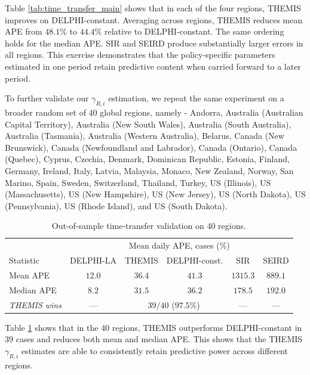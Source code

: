 \documentclass[msom,blindrev]{informs3} %
\newcommand{\rev}[1]{{\color{blue}#1}}
\begin{document}
\begin{APPENDICES}
{\color{blue}
Table \ref{tab:time_transfer_main} shows that in each of the four regions, THEMIS improves on DELPHI-constant. Averaging across regions, THEMIS reduces mean APE from $48.1\%$ to $44.4\%$ relative to DELPHI-constant. The same ordering holds for the median APE. SIR and SEIRD produce substantially larger errors in all regions. This exercise demonstrates that the policy-specific parameters estimated in one period retain predictive content when carried forward to a later period.
}

{\color{blue}
To further validate our $\gamma_{R,i}$ estimation, we repeat the same experiment on a broader random set of 40 global regions, namely - Andorra, Australia (Australian Capital Territory), Australia (New South Wales), Australia (South
  Australia), Australia (Tasmania), Australia (Western Australia), Belarus, Canada (New Brunswick),
  Canada (Newfoundland and Labrador), Canada (Ontario), Canada (Quebec), Cyprus, Czechia, Denmark,      
  Dominican Republic, Estonia, Finland, Germany, Ireland, Italy, Latvia, Malaysia, Monaco, New Zealand,
  Norway, San Marino, Spain, Sweden, Switzerland, Thailand, Turkey, US (Illinois), US (Massachusetts),  
  US (New Hampshire), US (New Jersey), US (North Dakota), US (Pennsylvania), US (Rhode Island), and US
  (South Dakota).
}

\begin{table}[htbp!]
\centering
{\color{blue}
\begin{tabular}{|l|ccccc|}
\hline
& \multicolumn{5}{c|}{Mean daily APE, cases (\%)} \\
Statistic & DELPHI-LA & THEMIS & DELPHI-const. & SIR & SEIRD \\\hline
Mean APE   & $12.0$ & $\mathbf{36.4}$ & $41.3$ & $1315.3$ & $889.1$ \\
Median APE & $8.2$  & $\mathbf{31.5}$ & $36.2$ & $178.5$  & $192.0$ \\
\textit{THEMIS wins} & ---   & \multicolumn{2}{c}{$39/40$ ($97.5\%$)} & --- & --- \\\hline
\end{tabular}
}
\caption{\rev{Out-of-sample time-transfer validation on 40 regions.}}
\label{tab:time_transfer_expanded}
\end{table}

{\color{blue}
Table \ref{tab:time_transfer_expanded} shows that in the 40 regions, THEMIS outperforms DELPHI-constant in 39 cases and reduces both mean and median APE. This shows that the THEMIS $\gamma_{R,i}$ estimates are able to consistently retain predictive power across different regions.}



\end{APPENDICES}
\end{document}
